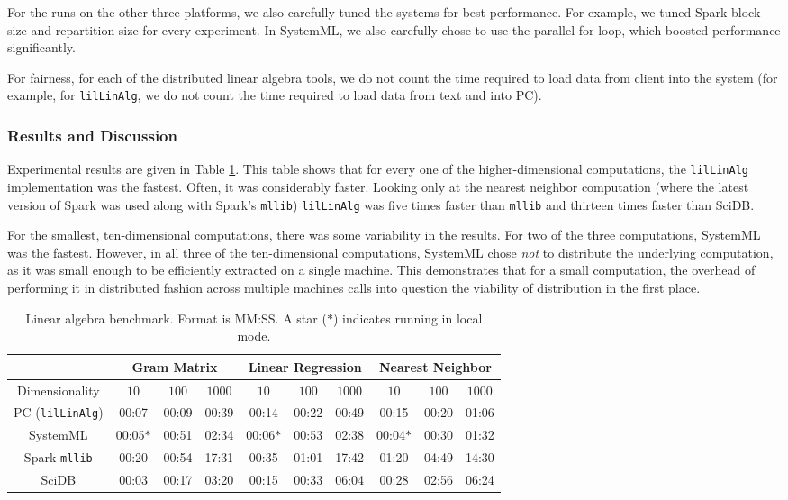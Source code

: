 For the runs on the other three platforms, we also carefully tuned the
systems for best performance. For example, we tuned Spark block size and repartition
size for every experiment. In SystemML, we also carefully chose to
use the parallel for loop, which boosted performance significantly.

For fairness, for each of the distributed linear algebra tools, 
we do not count the time required to load data from client into the system
(for example, 
for \texttt{lilLinAlg}, we do not count the time required to load data from text and into PC).

\subsubsection {Results and Discussion}

Experimental results are given in 
Table \ref{fig:LR}. 
This table shows that for every one of the higher-dimensional computations, the 
\texttt{lilLinAlg} implementation was the fastest.  Often, it was considerably faster.
Looking only at the nearest neighbor computation (where the latest version of Spark was used
along with Spark's \texttt{mllib}) \texttt{lilLinAlg} was five times faster than \texttt{mllib}
and thirteen times faster than SciDB.  

For the smallest, ten-dimensional computations, there was some variability in the results.
For two of the three computations, 
SystemML was the fastest.  However, in all three of the ten-dimensional computations, SystemML chose
\emph{not} to distribute the underlying computation, as it was small enough to be efficiently extracted
on a single machine.  This demonstrates that for a small computation, the overhead of performing it in 
distributed fashion across multiple machines calls into question the viability of distribution in the first place.

\begin{table}[h!]
\begin{center}
\begin{tabular}{|c||c|c|c||c|c|c||c|c|c|}
\hline
& \multicolumn{3}{c||}{Gram Matrix} & \multicolumn{3}{c||}{Linear Regression} & \multicolumn{3}{c|}{Nearest Neighbor} \\
\hline
Dimensionality & $10$ & $100$ & $1000$& $10$ & $100$ & $1000$& $10$ & $100$ & $1000$ \\
\hline
\hline
PC (\texttt{lilLinAlg}) &00:07 & 00:09 &00:39 &00:14 &00:22 &00:49& 00:15 & 00:20 & 01:06 \\
SystemML &00:05$*$ &00:51 &02:34 &00:06$*$ &00:53 &02:38 &00:04$*$ &00:30 &01:32 \\
Spark \texttt{mllib} &00:20  &00:54 &17:31 &00:35 &01:01 &17:42 &01:20 & 04:49 &14:30 \\
SciDB   &00:03 &00:17 &03:20 &00:15 &00:33 &06:04 &00:28 &02:56 & 06:24 \\
\hline
\end{tabular}
\caption{Linear algebra benchmark. Format is MM:SS.
A star ($*$) indicates running in local mode.}
\label{fig:LR}
\end{center}
\end{table}

